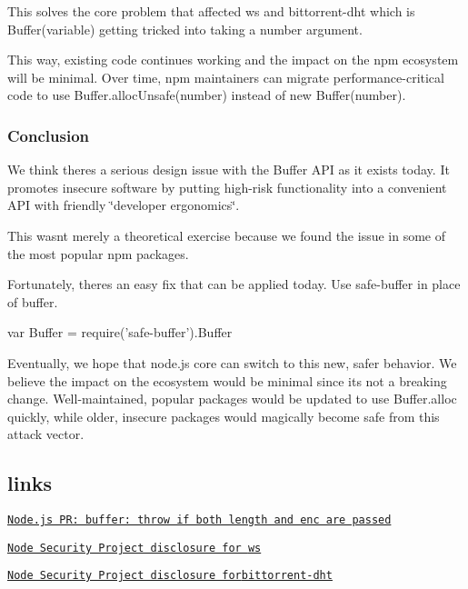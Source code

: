 This solves the core problem that affected {\ttfamily ws} and {\ttfamily bittorrent-\/dht} which is {\ttfamily Buffer(variable)} getting tricked into taking a number argument.

This way, existing code continues working and the impact on the npm ecosystem will be minimal. Over time, npm maintainers can migrate performance-\/critical code to use {\ttfamily Buffer.\+alloc\+Unsafe(number)} instead of {\ttfamily new Buffer(number)}.

\subsubsection*{Conclusion}

We think there\textquotesingle{}s a serious design issue with the {\ttfamily Buffer} A\+PI as it exists today. It promotes insecure software by putting high-\/risk functionality into a convenient A\+PI with friendly \char`\"{}developer ergonomics\char`\"{}.

This wasn\textquotesingle{}t merely a theoretical exercise because we found the issue in some of the most popular npm packages.

Fortunately, there\textquotesingle{}s an easy fix that can be applied today. Use {\ttfamily safe-\/buffer} in place of {\ttfamily buffer}.


\begin{DoxyCode}
var Buffer = require('safe-buffer').Buffer
\end{DoxyCode}


Eventually, we hope that node.\+js core can switch to this new, safer behavior. We believe the impact on the ecosystem would be minimal since it\textquotesingle{}s not a breaking change. Well-\/maintained, popular packages would be updated to use {\ttfamily Buffer.\+alloc} quickly, while older, insecure packages would magically become safe from this attack vector.

\subsection*{links}


\begin{DoxyItemize}
\item \href{https://github.com/nodejs/node/pull/4514}{\tt Node.\+js P\+R\+: buffer\+: throw if both length and enc are passed}
\item \href{https://nodesecurity.io/advisories/67}{\tt Node Security Project disclosure for {\ttfamily ws}}
\item \href{https://nodesecurity.io/advisories/68}{\tt Node Security Project disclosure for{\ttfamily bittorrent-\/dht}}
\end{DoxyItemize}

